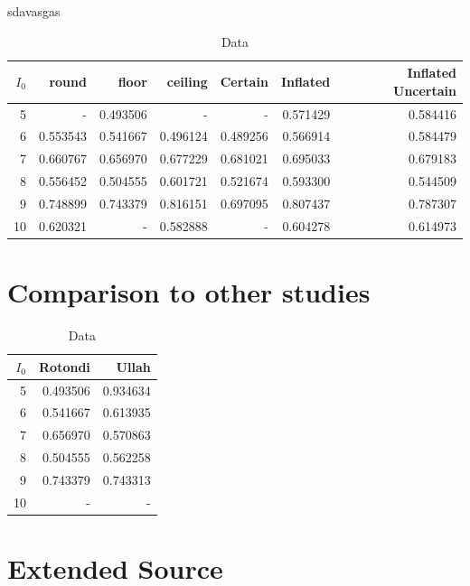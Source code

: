 sdavasgas
\begin{table}[ht]
\centering
\begin{tabular}{rrrrrrr}
  \hline
 $I_0$& round & floor & ceiling & Certain & Inflated & Inflated Uncertain \\ 
  \hline 
  5 & - & \cellcolor{green!25}0.493506 & - & - & 0.571429 & \cellcolor{red!25}0.584416 \\ 
  6 & 0.553543 & 0.541667 & \cellcolor{green!25}0.496124 & 0.489256 & 0.566914 & \cellcolor{red!25}0.584479 \\ 
  7 & 0.660767 & \cellcolor{green!25}0.656970 & 0.677229 & 0.681021 & \cellcolor{red!25}0.695033 & 0.679183 \\ 
  8 & 0.556452 & \cellcolor{green!25}0.504555 & \cellcolor{red!25}0.601721 & 0.521674 & 0.593300 & 0.544509 \\ 
  9 & 0.748899 & 0.743379 & \cellcolor{red!25}0.816151 & \cellcolor{green!25}0.697095 & 0.807437 & 0.787307 \\ 
  10 & \cellcolor{red!25}0.620321 & - & \cellcolor{green!25}0.582888 &-  & 0.604278 & 0.614973 \\ 
   \hline
\end{tabular}
\caption[Data]{Data}
     \label{table:Rotondi}
\end{table}

\section{Comparison to other studies}


\begin{table}[!ht]
\centering
\begin{tabular}{rrr}
  \hline
 $I_0$& Rotondi & Ullah \\ 
  \hline
  5 & \cellcolor{green!25}0.493506  & \cellcolor{red!25}0.934634\\ 
  6 & \cellcolor{green!25} 0.541667 & \cellcolor{red!25}0.613935 \\ 
  7 & \cellcolor{green!25}0.656970  & \cellcolor{red!25}0.570863 \\ 
  8 & \cellcolor{green!25}0.504555 & \cellcolor{red!25}0.562258  \\ 
  9 & \cellcolor{red!25}0.743379 & \cellcolor{green!25}0.743313  \\ 
  10 & - & - \\ 
   \hline
   \end{tabular}
\caption[Data]{Data}
     \label{table:Ullah}
\end{table}

\section{Extended Source}